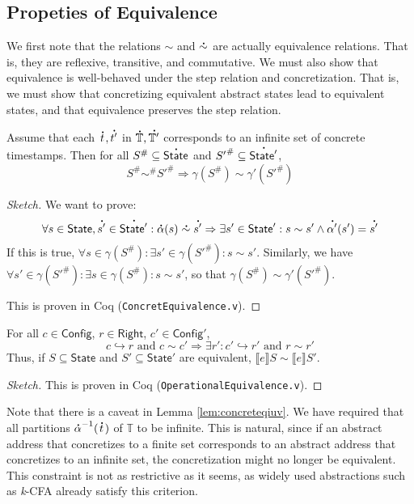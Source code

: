 \documentclass[acmsmall,screen,review]{acmart}\settopmatter{printfolios=true,printccs=false,printacmref=false}
\newcommand*{\A}[1]{\overset{\,_{\mbox{\Large .}}}{#1}}
\newcommand*{\Abs}[1]{{#1}^{\#}}
\newcommand*{\Time}{\mathbb{T}}
\newcommand*{\ATime}{\A{\Time}}
\newcommand*{\Config}{\mathsf{Config}}
\newcommand*{\config}{c}
\newcommand*{\Right}{\mathsf{Right}}
\newcommand*{\rightst}{r}
\newcommand*{\State}{\mathsf{State}}
\newcommand*{\AState}{\A{\mathsf{State}}}
\newcommand*{\semarrow}{\hookrightarrow}
\newcommand*{\equivalent}{\sim}
\newcommand*{\sembracket}[1]{\lBrack{#1}\rBrack}
\begin{document}
\subsection{Propeties of Equivalence}
We first note that the relations $\equivalent$ and $\A\equivalent$ are actually equivalence relations.
That is, they are reflexive, transitive, and commutative.
We must also show that equivalence is well-behaved under the step relation and concretization.
That is, we must show that concretizing equivalent abstract states lead to equivalent states, and that equivalence preserves the step relation.
\begin{lemma}\label{lem:concreteqiuv}
  Assume that each $\A{t},\A{t'}$ in $\ATime,\A{\Time'}$ corresponds to an infinite set of concrete timestamps.
  Then for all $\Abs{S}\subseteq\AState$ and $\Abs{S'}\subseteq\A{\State'}$,
  \[\Abs{S}\Abs\equivalent\Abs{S'}\Rightarrow\gamma(\Abs{S})\equivalent\gamma'(\Abs{S'})\]
\end{lemma}
\begin{proof}[Sketch]
  We want to prove:
  \[\forall s\in\State,\A{s'}\in\A{\State'}:\A\alpha(s)\A\equivalent\A{s'}\Rightarrow\exists s'\in\State':s\equivalent s'\land\A{\alpha'}(s')=\A{s'}\]
  If this is true, $\forall s\in\gamma(\Abs{S}):\exists s'\in\gamma(\Abs{S'}):s\equivalent s'$.
  Similarly, we have $\forall s'\in\gamma(\Abs{S'}):\exists s\in\gamma(\Abs{S}):s\equivalent s'$, so that $\gamma(\Abs{S})\equivalent\gamma'(\Abs{S'})$.

  This is proven in Coq (\texttt{ConcretEquivalence.v}).
\end{proof}
\begin{lemma}
  For all $\config\in\Config$, $\rightst\in\Right$, $\config'\in\Config'$,
  \[\config\semarrow\rightst\text{ and }\config\equivalent\config'\Rightarrow\exists\rightst':\config'\semarrow\rightst'\text{ and }\rightst\equivalent\rightst'\]
  Thus, if $S\subseteq\State$ and $S'\subseteq\State'$ are equivalent, $\sembracket{e}S\equivalent\sembracket{e}S'$.
\end{lemma}
\begin{proof}[Sketch]
  This is proven in Coq (\texttt{OperationalEquivalence.v}).
\end{proof}
Note that there is a caveat in Lemma \ref{lem:concreteqiuv}.
We have required that all partitions ${\A\alpha}^{-1}(\A{t})$ of $\Time$ to be infinite.
This is natural, since if an abstract address that concretizes to a finite set corresponds to an abstract address that concretizes to an infinite set, the concretization might no longer be equivalent.
This constraint is not as restrictive as it seems, as widely used abstractions such as \emph{k}-CFA already satisfy this criterion.
\end{document}
